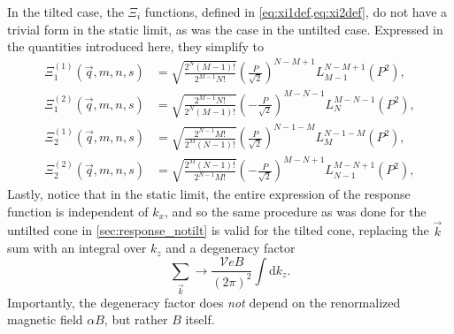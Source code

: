 In the tilted case, the \( \Xi_{i} \) functions, defined in \cref{eq:xi1def,eq:xi2def}, do not have a trivial form in the static limit, as was the case in the untilted case.
Expressed in the quantities introduced here, they simplify to
\begin{subequations}
  \begin{align}
    \Xi_1 ^{(1)}(\vec{q}, m, n, s) &= \sqrt{\frac{2^N (M-1)!}{2^{M-1} N!}}
                                     \left( \frac{P}{\sqrt{2}} \right)^{N-M + 1}
                                     L^{N-M+1}_{M-1} \left( P^2 \right),\\
    \Xi_1 ^{(2)}(\vec{q}, m, n, s) &= \sqrt{\frac{2^{M-1} N!}{2^N (M-1)!}}
                                     \left( -\frac{P}{\sqrt{2}} \right)^{M-N - 1}
                                     L^{M - N - 1}_N \left( P^2 \right),
  \end{align}
\end{subequations}
\begin{subequations}
  \begin{align}
    \Xi_2 ^{(1)}(\vec{q}, m, n, s) &= \sqrt{\frac{2^{N-1} M!}{2^M (N-1)!}}
                                     \left( \frac{P}{\sqrt{2}} \right)^{N-1 - M}
                                     L^{N-1 -M}_{M} \left( P^2 \right),\\
    \Xi_2 ^{(2)}(\vec{q}, m, n, s) &= \sqrt{\frac{2^M (N-1)!}{2^{N-1} M!}}
                                     \left( -\frac{P}{\sqrt{2}} \right)^{M-N + 1}
                                     L^{M - N + 1}_{N-1} \left( P^2 \right),
  \end{align}
\end{subequations}
Lastly, notice that in the static limit, the entire expression of the response function is independent of \( k_x \), and so the same procedure as was done for the untilted cone in \cref{sec:response_notilt} is valid for the tilted cone, replacing the \( \vec{k} \) sum with an integral over \( k_z \) and a degeneracy factor
\begin{equation}
  \label{eq:113}
  \sum\limits_{\vec{k}}^{} \to \frac{\mathcal{V} e B}{(2\pi)^2 } \int \mathrm{d} k_z.
\end{equation}
Importantly, the degeneracy factor does \emph{not} depend on the renormalized magnetic field \( \alpha B \), but rather \( B \) itself.

